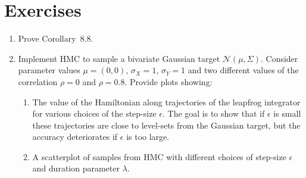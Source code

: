 
\section{Exercises}
\label{sec:8.4}

\begin{enumerate}

\item[8.1] Prove Corollary~8.8.

\item[8.2] Implement HMC to sample a bivariate Gaussian target $\mathcal{N}(\mu, \Sigma)$.
Consider parameter values $\mu = (0,0)$, $\sigma_X = 1$, $\sigma_Y = 1$ and two different
values of the correlation $\rho = 0$ and $\rho = 0.8$. Provide plots showing:
\begin{enumerate}
  \item The value of the Hamiltonian along trajectories of the leapfrog integrator for various
    choices of the step-size $\epsilon$. The goal is to show that if $\epsilon$ is small these
    trajectories are close to level-sets from the Gaussian target, but the accuracy deteriorates
    if $\epsilon$ is too large.
  \item A scatterplot of samples from HMC with different choices of step-size $\epsilon$ and
    duration parameter $\lambda$.
\end{enumerate}


\end{enumerate}
